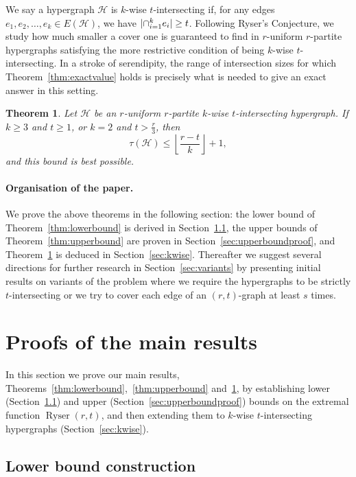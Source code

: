 \documentclass[a4paper,twoside,11pt]{article}
\DeclarePairedDelimiter{\card}{|}{|}
\newtheorem{thm}{Theorem}
\numberwithin{thm}{section}
\theoremstyle{definition}
\theoremstyle{remark}
\theoremstyle{definition}
\newcommand{\m}[1]{\mathcal{#1}}
\DeclareMathOperator{\Ryser}{Ryser}
\begin{document}
We say a hypergraph $\m H$ is $k$-wise $t$-intersecting if, for any edges $e_1, e_2, \hdots, e_k \in E(\m H)$, we have $\card{\cap_{i=1}^k e_i} \ge t$. Following Ryser's Conjecture, we study how much smaller a cover one is guaranteed to find in $r$-uniform $r$-partite hypergraphs satisfying the more restrictive condition of being $k$-wise $t$-intersecting. In a stroke of serendipity, the range of intersection sizes for which Theorem~\ref{thm:exactvalue} holds is precisely what is needed to give an exact answer in this setting.

\begin{thm} \label{thm:kwise}
Let $\m H$ be an $r$-uniform $r$-partite $k$-wise $t$-intersecting hypergraph.  If $k \ge 3$ and $t \ge 1$, or $k = 2$ and $t > \tfrac{r}{3}$, then
\[ \tau(\m H) \le \left\lfloor \frac{r-t}{k} \right\rfloor + 1, \]
and this bound is best possible.
\end{thm}


\paragraph{Organisation of the paper.}
We prove the above theorems in the following section: the lower bound of Theorem~\ref{thm:lowerbound} is derived in Section~\ref{sec:lowerboundproof}, the upper bounds of Theorem~\ref{thm:upperbound} are proven in Section~\ref{sec:upperboundproof}, and Theorem~\ref{thm:kwise} is deduced in Section~\ref{sec:kwise}. Thereafter we suggest several directions for further research in Section~\ref{sec:variants} by presenting initial results on variants of the problem where we require the hypergraphs to be strictly $t$-intersecting or we try to cover each edge of an $(r,t)$-graph at least $s$ times.

\section{Proofs of the main results}

In this section we prove our main results, Theorems~\ref{thm:lowerbound},~\ref{thm:upperbound} and~\ref{thm:kwise}, by establishing lower (Section~\ref{sec:lowerboundproof}) and upper (Section~\ref{sec:upperboundproof}) bounds on the extremal function $\Ryser(r,t)$, and then extending them to $k$-wise $t$-intersecting hypergraphs (Section~\ref{sec:kwise}).

\subsection{Lower bound construction} \label{sec:lowerboundproof}
\end{document}
